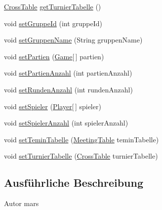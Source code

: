 \begin{DoxyCompactItemize}
\item 
\hyperlink{classde_1_1turnierverwaltung_1_1model_1_1_cross_table}{Cross\+Table} \hyperlink{classde_1_1turnierverwaltung_1_1model_1_1_group_ab83ced68e682f7b15477bc38d8876042}{get\+Turnier\+Tabelle} ()
\item 
void \hyperlink{classde_1_1turnierverwaltung_1_1model_1_1_group_a5c8739386f2acce2543a0741883eda48}{set\+Gruppe\+Id} (int gruppe\+Id)
\item 
void \hyperlink{classde_1_1turnierverwaltung_1_1model_1_1_group_adb133cfea3f8f5f9b18960ae55cc4150}{set\+Gruppen\+Name} (String gruppen\+Name)
\item 
void \hyperlink{classde_1_1turnierverwaltung_1_1model_1_1_group_a74a449eac2aa2ed2d9adc7906feb396c}{set\+Partien} (\hyperlink{classde_1_1turnierverwaltung_1_1model_1_1_game}{Game}\mbox{[}$\,$\mbox{]} partien)
\item 
void \hyperlink{classde_1_1turnierverwaltung_1_1model_1_1_group_a2fdfc510ae8425d948e9ddf5b1312983}{set\+Partien\+Anzahl} (int partien\+Anzahl)
\item 
void \hyperlink{classde_1_1turnierverwaltung_1_1model_1_1_group_ab3256ab6f6326e72d99455f70ce72e57}{set\+Runden\+Anzahl} (int runden\+Anzahl)
\item 
void \hyperlink{classde_1_1turnierverwaltung_1_1model_1_1_group_aac6c4c44ee310132e441661310ec4d1b}{set\+Spieler} (\hyperlink{classde_1_1turnierverwaltung_1_1model_1_1_player}{Player}\mbox{[}$\,$\mbox{]} spieler)
\item 
void \hyperlink{classde_1_1turnierverwaltung_1_1model_1_1_group_af29ac0044dad4dca4d5a7b97a35d7361}{set\+Spieler\+Anzahl} (int spieler\+Anzahl)
\item 
void \hyperlink{classde_1_1turnierverwaltung_1_1model_1_1_group_aaab662eb0af1efe7fd7157a86bf5599d}{set\+Temin\+Tabelle} (\hyperlink{classde_1_1turnierverwaltung_1_1model_1_1_meeting_table}{Meeting\+Table} temin\+Tabelle)
\item 
void \hyperlink{classde_1_1turnierverwaltung_1_1model_1_1_group_a8f63a6a76e1f8ab3059fff8ca2a60b9c}{set\+Turnier\+Tabelle} (\hyperlink{classde_1_1turnierverwaltung_1_1model_1_1_cross_table}{Cross\+Table} turnier\+Tabelle)
\end{DoxyCompactItemize}


\subsection{Ausführliche Beschreibung}
\begin{DoxyAuthor}{Autor}
mars 
\end{DoxyAuthor}


